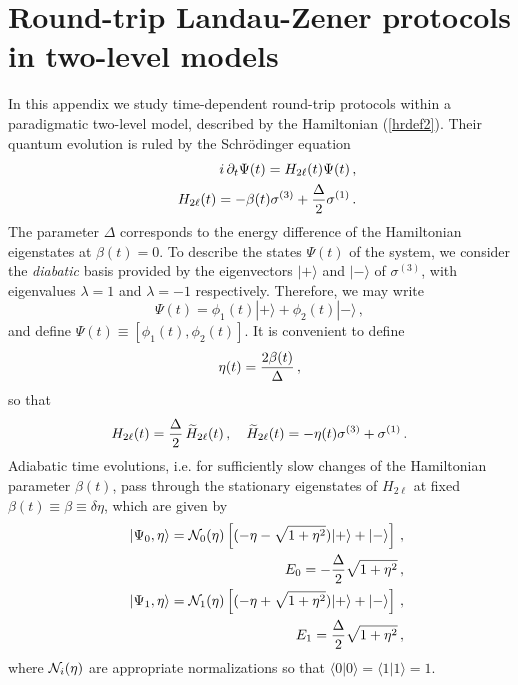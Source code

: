 \appendix


\chapter{Round-trip Landau-Zener protocols in two-level models}
\label{LZlike}

In this appendix we study time-dependent round-trip protocols within a
paradigmatic two-level model, described by the Hamiltonian
(\ref{hrdef2}).  Their quantum evolution is ruled by the Schr\"odinger
equation
\begin{eqnarray}
&&i \, \partial_t \Psi(t) = H_{2\ell}(t) \Psi(t)\,,
  \label{hrdef}\\
 &&   H_{2\ell}(t) = - \beta(t) \sigma^{(3)}
  + {\Delta\over 2} \sigma^{(1)}\,.
\nonumber
\end{eqnarray}
The parameter $\Delta$ corresponds to the energy difference of the
Hamiltonian eigenstates at $\beta(t)=0$.  To describe the states
$\Psi(t)$ of the system, we consider the {\em diabatic} basis provided
by the eigenvectors $|+ \rangle$ and $|-\rangle$ of $\sigma^{(3)}$,
with eigenvalues $\lambda=1$ and $\lambda=-1$ respectively.
Therefore, we may write
\begin{equation}
  \Psi(t) = \phi_1(t)|+\rangle +  \phi_2(t)|-\rangle  \,,
  \label{psitbas}
\end{equation}
and define $\Psi(t)\equiv [\phi_1(t),\phi_2(t)]$.
It is convenient to define
\begin{equation}
  \eta(t) = {2\beta(t)\over \Delta}\,,
  \label{etadef}
\end{equation}
so that
\begin{equation}
 H_{2\ell}(t) = {\Delta\over 2} \, \widetilde{H}_{2\ell}(t)\,,
  \quad
\widetilde{H}_{2\ell}(t) = - \eta(t) \sigma^{(3)} + \sigma^{(1)}\,. 
\label{redefH}
\end{equation}
Adiabatic time evolutions, i.e. for sufficiently slow changes of the
Hamiltonian parameter $\beta(t)$, pass through the stationary
eigenstates of $H_{2\ell}$ at fixed $\beta(t)\equiv \beta \equiv
\delta\eta$, which are given by
\begin{eqnarray}
 &&|\Psi_0,\eta \rangle = {\cal N}_0(\eta) \left[ (-\eta -
    \sqrt{1+\eta^2}) |+ \rangle + |-\rangle
    \right]\,,\nonumber\\ &&E_0 = - {\Delta\over 2} \sqrt{1 +
    \eta^2}\,,\label{gslz}\\ &&|\Psi_1,\eta\rangle = {\cal N}_1(\eta)
  \left[ (-\eta + \sqrt{1+\eta^2}) |+ \rangle + |-\rangle
    \right]\,,\nonumber\\ &&E_1 = {\Delta\over 2} \sqrt{1 +
    \eta^2}\,, \label{exlz}
\end{eqnarray}
where ${\cal N}_i(\eta)$ are appropriate normalizations so that
$\langle 0| 0 \rangle=\langle 1| 1\rangle=1$.

